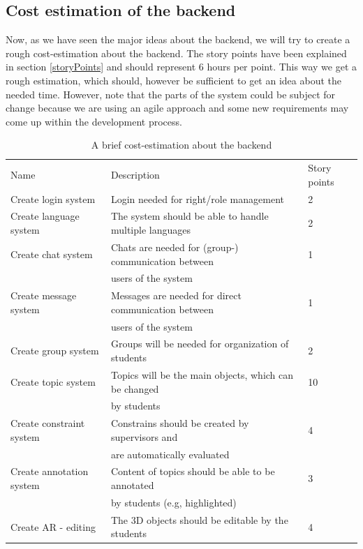 \subsection{Cost estimation of the backend}
\label{backendEstimation}
Now, as we have seen the major ideas about the backend, we will try to create a rough cost-estimation about the backend. The story points have been explained in section \ref{storyPoints} and should represent 6 hours per point. This way we get a rough estimation, which should, however be sufficient to get an idea about the needed time. However, note that the parts of the system could be subject for change because we are using an agile approach and some new requirements may come up within the development process.

 \begin{table}[h]
\scriptsize
 \caption{A brief cost-estimation about the backend}
 \begin{tabular}{lll}
	\toprule
  Name & Description & Story points \\ 
\cmidrule(rl){1-1}\cmidrule(rl){2-2}\cmidrule(rl){3-3}
	Create login system		&	Login needed for right/role management			&	2 \\	
	Create language system	&	The system should be able to handle multiple languages&	2 \\	
	Create chat system		&	Chats are needed for (group-) communication between &	1 \\	
		 				&	users of the system 							&	 \\	
	Create message system &	Messages are needed for direct communication between&	1 \\
	 					&	users of the system 							&	 \\		
  	Create group system 	& 	Groups will be needed for organization of students 	& 	2 \\
  	Create topic system 	& 	Topics will be the main objects, which can be changed  	& 	10 \\
  	 					& 	by students  								 	&	   \\
	Create constraint system  &	Constrains should be created by supervisors and 		&	4 \\
						&	are automatically evaluated						&	   \\	
  	Create annotation system & 	Content of topics should be able to be annotated  		& 	3 \\
  	 					& 	by students  (e.g, highlighted)						&	   \\
  	Create \ac{AR} - editing  & 	The 3D objects should be editable by the students 	& 	4 \\

\end{tabular}
\end{table}
